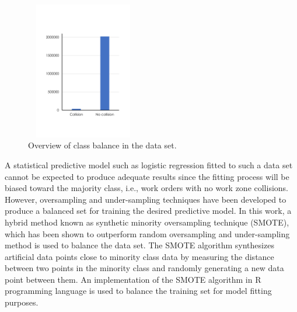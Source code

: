 \documentclass[10pt,a4paper]{article}
\begin{document}
\begin{figure}[b!]
	\centering
	\includegraphics[width=5cm,height=6cm, trim=2cm 4.5cm 2cm 6cm, clip=true]{Data imbalance-cr1}
	\caption{Overview of class balance in the data set.}
	\label{fig:dataimb}
\end{figure}

A statistical predictive model such as logistic regression fitted to such a data set cannot be expected to produce adequate results since the fitting process will be biased toward the majority class, i.e., work orders with no work zone collisions. However, oversampling and under-sampling techniques have been developed to produce a balanced set for training the desired predictive model. In this work, a hybrid method known as synthetic minority oversampling technique (SMOTE), which has been shown to outperform random oversampling and under-sampling method \citep{chawla2002smote} is used to balance the data set. The SMOTE algorithm synthesizes artificial data points close to minority class data by measuring the distance between two points in the minority class and randomly generating a new data point between them. An implementation of the SMOTE algorithm in R programming language is used to balance the training set for model fitting purposes.

\end{document}
